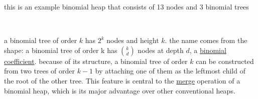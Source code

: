 \documentclass[a4paper,12pt]{article}
\begin{document}
\begin{definition}
\begin{my_example}
this is an example binomial heap that consists of 13 nodes and 3 binomial trees\\[0pt]
\begin{center}

\label{orgd409229}
\end{center}\\[0pt]
\end{my_example}

\begin{characteristic}
a binomial tree of order \(k\) has \(2^{k}\) nodes and height \(k\). the name comes from the shape: a binomial tree of order k has \(\binom{k}{d}\) nodes at depth \(d\), a \href{20221204105120-combinatorics.org}{binomial coefficient}. because of its structure, a binomial tree of order \(k\) can be constructed from two trees of order \(k-1\) by attaching one of them as the leftmost child of the root of the other tree. This feature is central to the \hyperref[sec:org6a4cc43]{merge} operation of a binomial heap, which is its major advantage over other conventional heaps.\\[0pt]
\end{characteristic}
\end{definition}
\end{document}
